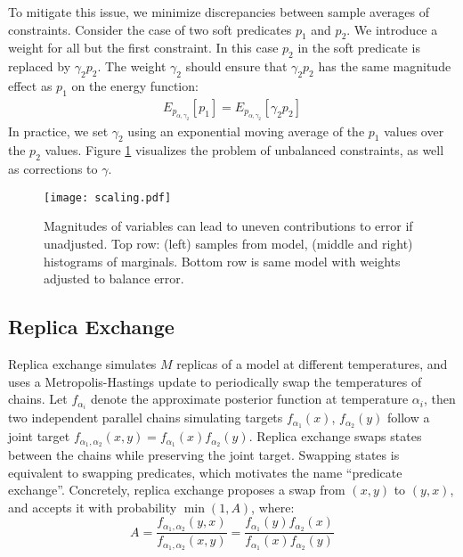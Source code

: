 To mitigate this issue, we minimize discrepancies between sample averages of constraints.
Consider the case of two 
soft predicates $p_1$ and $p_2$. We introduce a weight for all but the first constraint.
In this case $p_2$ in the soft predicate is replaced
by $\gamma_2 p_2$. The weight $\gamma_2$ should
ensure that $\gamma_2 p_2$ has the same
magnitude effect as $p_1$ on the energy
function:
\begin{align*}
E_{p_{\alpha, \gamma_2}}[p_1] = E_{p_{\alpha, \gamma_2}}[\gamma_2 p_2] 
\end{align*}
In practice, we set $\gamma_2$ using an exponential moving
average of the $p_1$ values over the $p_2$ values.
Figure \ref{scaling} visualizes the problem of unbalanced constraints, as well as corrections to $\gamma$.


\begin{figure}
  \centering
  \texttt{[image: scaling.pdf]}
  \caption{Magnitudes of variables can lead to uneven contributions to error if unadjusted.  Top row: (left) samples from model, (middle and right) histograms of marginals.  Bottom row is same model with weights adjusted to balance error.}\label{scaling}
  \end{figure}

  
\subsection{Replica Exchange}\label{replicaexchange}
Replica exchange \citep{swendsen1986replica} simulates $M$ replicas of a model at different temperatures, and uses a Metropolis-Hastings update to  periodically swap the temperatures of chains.
Let $f_{\alpha_i}$ denote the approximate posterior function at temperature $\alpha_i$, then two independent parallel chains simulating targets $f_{\alpha_1}(x)$, $f_{\alpha_2}(y)$  follow a joint target $f_{\alpha_1, \alpha_2}(x,y) = f_{\alpha_1}(x)f_{\alpha_2}(y)$.
Replica exchange swaps states between the chains while preserving the joint target.
Swapping states is equivalent to swapping predicates, which motivates the name ``predicate exchange''.
Concretely, replica exchange proposes a swap from $(x, y)$ to $(y, x)$, and accepts it with probability $\min(1, A)$, where:
\begin{equation}
A =  \frac{f_{\alpha_1, \alpha_2}(y,x)}{f_{\alpha_1, \alpha_2}(x,y)} = \frac{f_{\alpha_1}(y)f_{\alpha_2}(x)}{f_{\alpha_1}(x)f_{\alpha_2}(y)}
\end{equation}

